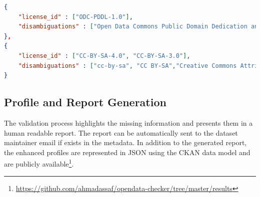 \documentclass[runningheads,a4paper]{../../Util/LaTEX/llncs}
\begin{document}
\begin{lstlisting}[language=json]
{
	"license_id" : ["ODC-PDDL-1.0"],
	"disambiguations" : ["Open Data Commons Public Domain Dedication and License (PDDL)"]
},
{
	"license_id" : ["CC-BY-SA-4.0", "CC-BY-SA-3.0"],
	"disambiguations" : ["cc-by-sa", "CC BY-SA","Creative Commons Attribution Share-Alike"]
}
\end{lstlisting}



\subsection{Profile and Report Generation}
The validation process highlights the missing information and presents them in a human readable report. The report can be automatically sent to the dataset maintainer email if exists in the metadata. In addition to the generated report, the enhanced profiles are represented in JSON using the CKAN data model and are publicly available\footnote{\url{https://github.com/ahmadassaf/opendata-checker/tree/master/results}}.
\end{document}
